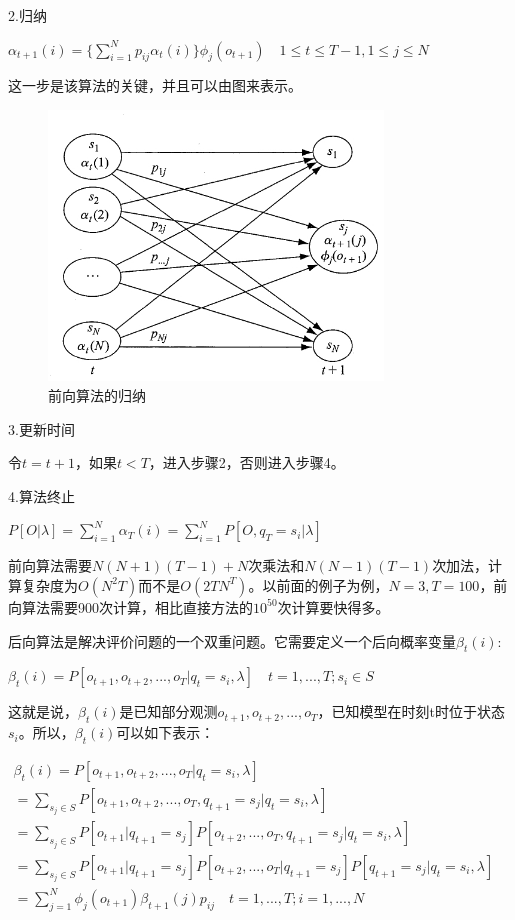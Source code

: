 \documentclass[UTF8]{ctexart}
\begin{document}
2.归纳

\begin{center}
$
\alpha_{t+1}(i)=\{\sum_{i=1}^Np_{ij}\alpha_t(i)\}\phi_j(o_{t+1})  \quad1\le t\le T-1,1\le j \le N
$
\end{center}

这一步是该算法的关键，并且可以由图来表示。

\begin{figure}[htbp]
\centering\includegraphics[width=3.5in]{f115}
\caption{前向算法的归纳}\label{fig:2}
\end{figure}

3.更新时间

令$t = t+1$，如果$t < T$，进入步骤2，否则进入步骤4。

4.算法终止

\begin{center}
$
P[O|\lambda]=\sum_{i=1}^N\alpha_T(i)=\sum_{i=1}^NP[O,q_T=s_i|\lambda]
$
\end{center}

前向算法需要$N(N+1)(T-1)+N$次乘法和$N(N-1)(T-1)$次加法，计算复杂度为$O(N^2T)$而不是$O(2TN^T)$。以前面的例子为例，$N=3,T=100$，前向算法需要900次计算，相比直接方法的$10^50$次计算要快得多。

后向算法是解决评价问题的一个双重问题。它需要定义一个后向概率变量$\beta_t(i)$:

\begin{center}
$
\beta_t(i)=P[o_{t+1},o_{t+2},...,o_T|q_t=s_i,\lambda]\quad t=1,...,T;s_i\in S
$
\end{center}

这就是说，$\beta_t(i)$是已知部分观测$o_{t+1},o_{t+2},...,o_T$，已知模型在时刻t时位于状态$s_i$。所以，$\beta_t(i)$可以如下表示：

\begin{center}
$
\begin{aligned}
\beta_t(i)=P[o_{t+1},o_{t+2},...,o_T|q_t=s_i,\lambda]\\
=\sum_{s_j\in S}P[o_{t+1},o_{t+2},...,o_T,q_{t+1}=s_j|q_t=s_i,\lambda]\\
=\sum_{s_j\in S}P[o_{t+1}|q_{t+1}=s_j]P[o_{t+2},...,o_T,q_{t+1}=s_j|q_t=s_i,\lambda]\\
=\sum_{s_j\in S}P[o_{t+1}|q_{t+1}=s_j]P[o_{t+2},...,o_T|q_{t+1}=s_j]P[q_{t+1}=s_j|q_t=s_i,\lambda]\\
=\sum_{j=1}^N\phi_j(o_{t+1})\beta_{t+1}(j)p_{ij}\quad t=1,...,T;i=1,...,N
\end{aligned}$
\end{center}
\end{document}
